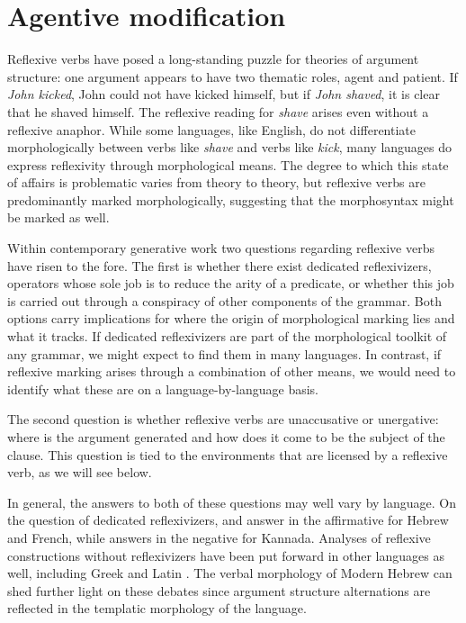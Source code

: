 \section{Agentive modification}
Reflexive verbs have posed a long-standing puzzle for theories of argument structure: one argument appears to have two thematic roles, agent and patient. If \emph{John kicked}, John could not have kicked himself, but if \emph{John shaved}, it is clear that he shaved himself. The reflexive reading for \emph{shave} arises even without a reflexive anaphor. While some languages, like English, do not differentiate morphologically between verbs like \emph{shave} and verbs like \emph{kick}, many languages do express reflexivity through morphological means. The degree to which this state of affairs is problematic varies from theory to theory, but reflexive verbs are predominantly marked morphologically, suggesting that the morphosyntax might be marked as well.

Within contemporary generative work two questions regarding reflexive verbs have risen to the fore. The first is whether there exist dedicated reflexivizers, operators whose sole job is to reduce the arity of a predicate, or whether this job is carried out through a conspiracy of other components of the grammar. Both options carry implications for where the origin of morphological marking lies and what it tracks. If dedicated reflexivizers are part of the morphological toolkit of any grammar, we might expect to find them in many languages. In contrast, if reflexive marking arises through a combination of other means, we would need to identify what these are on a language-by-language basis.

The second question is whether reflexive verbs are unaccusative or unergative: where is the argument generated and how does it come to be the subject of the clause. This question is tied to the environments that are licensed by a reflexive verb, as we will see below.

In general, the answers to both of these questions may well vary by language. On the question of dedicated reflexivizers, \cite{reinhartsiloni05} and \cite{labelle08} answer in the affirmative for Hebrew and French, while \cite{lidz01} answers in the negative for Kannada. Analyses of reflexive constructions without reflexivizers have been put forward in other languages as well, including Greek \citep{spathasetal15} and Latin \citep{miller10latin}. The verbal morphology of Modern Hebrew can shed further light on these debates since argument structure alternations are reflected in the templatic morphology of the language.

